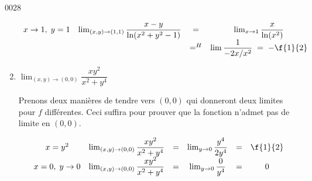 \begin{corrige}{0028}
\begin{enumerate}
\begin{alternative}
\[\begin{array}{cccc}
	x\rightarrow 1, \; y=1 & \lim_{(x,y)\rightarrow (1,1)} \dfrac{x-y}{\ln(x^2+y^2-1) } & = & \lim_{x\rightarrow 1}\dfrac{x}{\ln(x^2)} \\
	& &=^H&\lim\dfrac{1}{-2x/x^2} \;= \; -\f{1}{2} 
     \end{array}\]
										    
\end{alternative}
									
	\item $\lim_{(x,y)\rightarrow (0,0)} \dfrac{xy^2}{x^2+y^4}$

	Prenons deux manières de tendre vers $(0,0)$ qui donneront deux limites pour $f$ différentes. Ceci suffira pour prouver que la fonction n'admet pas de limite en $(0,0)$.

    \[\begin{array}{cccccc} x=y^2 & \lim_{(x,y)\rightarrow (0,0)} \dfrac{xy^2}{x^2+y^4} & =& \lim_{y\rightarrow 0}\dfrac{y^4}{2y^4} &=& \f{1}{2} \\

        x=0, \; y\rightarrow 0 & \lim_{(x,y)\rightarrow (0,0)} \dfrac{xy^2}{x^2+y^4} & =& \lim_{y\rightarrow 0}\dfrac{0}{y^4} &=& 0 \end{array}\]

\end{enumerate}

\end{corrige}
